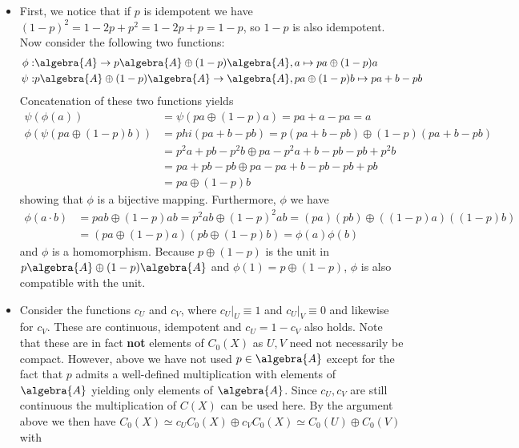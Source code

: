 \documentclass[a4paper]{article}
\begin{document}
\begin{itemize}
    \item First, we notice that if $p$ is idempotent we have $(1-p)^2 = 1 - 2p + p^2 = 1 - 2p + p = 1-p$, so $1-p$ is also idempotent. Now consider the following two functions:
    \begin{align*}
        \phi: &\algebra{A} \to p \algebra{A} \oplus (1-p) \algebra{A}, a \mapsto pa \oplus (1-p)a\\
        \psi: &p \algebra{A} \oplus (1-p) \algebra{A} \to \algebra{A}, pa \oplus (1-p)b \mapsto pa + b - pb
    \end{align*}
    Concatenation of these two functions yields
    \begin{align*}
        \psi(\phi(a)) &= \psi(pa \oplus (1-p)a) = pa + a - pa = a\\
        \phi(\psi(pa \oplus (1-p)b)) &= phi(pa + b - pb) = p (pa + b - pb) \oplus (1-p)(pa + b - pb)\\
        &= p^2 a + pb - p^2b \oplus pa - p^2a + b - pb - pb + p^2 b\\
        &= p a + pb - pb \oplus pa - pa + b - pb - pb + pb\\
        &= pa \oplus (1-p) b
    \end{align*}
    showing that $\phi$ is a bijective mapping. Furthermore, $\phi$ we have
    \begin{align*}
        \phi(a \cdot b) &= p a b \oplus (1-p) ab = p^2 ab \oplus (1-p)^2 ab = (pa)(pb) \oplus ((1-p)a)((1-p)b)\\
        &= (pa \oplus (1-p)a) (pb \oplus (1-p)b) = \phi(a) \phi(b)
    \end{align*}
    and $\phi$ is a homomorphism. Because $p \oplus (1-p)$ is the unit in $p \algebra{A} \oplus (1-p) \algebra{A}$ and $\phi(1) = p \oplus (1-p)$, $\phi$ is also compatible with the unit.
    \item Consider the functions $c_U$ and $c_V$, where $c_U|_U \equiv 1$ and $c_U|_V \equiv 0$ and likewise for $c_V$. These are continuous, idempotent and $c_U = 1 - c_V$ also holds. Note that these are in fact \textbf{not} elements of $C_0(X)$ as $U,V$ need not necessarily be compact. However, above we have not used $p \in \algebra{A}$ except for the fact that $p$ admits a well-defined multiplication with elements of $\algebra{A}$ yielding only elements of $\algebra{A}$. Since $c_U,c_V$ are still continuous the multiplication of $C(X)$ can be used here. By the argument above we then have $C_0(X) \simeq c_U C_0(X) \oplus c_V C_0(X) \simeq C_0(U) \oplus C_0(V)$ with 

\end{itemize}
\end{document}
